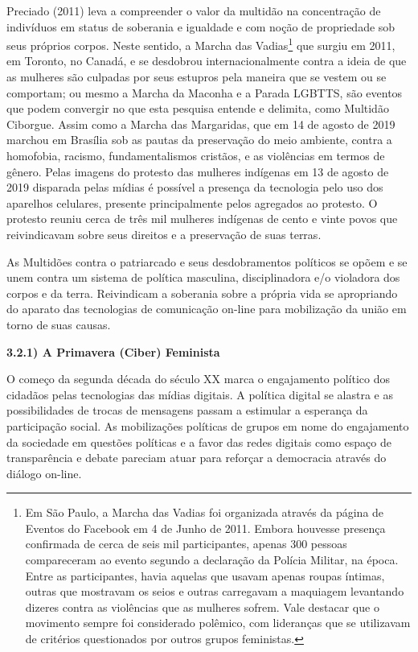 Preciado (2011) leva a compreender o valor da multidão na concentração
de indivíduos em status de soberania e igualdade e com noção de
propriedade sob seus próprios corpos. Neste sentido, a Marcha das
Vadias\footnote{Em São Paulo, a Marcha das Vadias foi organizada através
  da página de Eventos do Facebook em 4 de Junho de 2011. Embora
  houvesse presença confirmada de cerca de seis mil participantes,
  apenas 300 pessoas compareceram ao evento segundo a declaração da
  Polícia Militar, na época. Entre as participantes, havia aquelas que
  usavam apenas roupas íntimas, outras que mostravam os seios e outras
  carregavam a maquiagem levantando dizeres contra as violências que as
  mulheres sofrem. Vale destacar que o movimento sempre foi considerado
  polêmico, com lideranças que se utilizavam de critérios questionados
  por outros grupos feministas.} que surgiu em 2011, em Toronto, no
Canadá, e se desdobrou internacionalmente contra a ideia de que as
mulheres são culpadas por seus estupros pela maneira que se vestem ou se
comportam; ou mesmo a Marcha da Maconha e a Parada LGBTTS, são eventos
que podem convergir no que esta pesquisa entende e delimita, como
Multidão Ciborgue. Assim como a Marcha das Margaridas, que em 14 de
agosto de 2019 marchou em Brasília sob as pautas da preservação do meio
ambiente, contra a homofobia, racismo, fundamentalismos cristãos, e as
violências em termos de gênero. Pelas imagens do protesto das mulheres
indígenas em 13 de agosto de 2019 disparada pelas mídias é possível a
presença da tecnologia pelo uso dos aparelhos celulares, presente
principalmente pelos agregados ao protesto. O protesto reuniu cerca de
três mil mulheres indígenas de cento e vinte povos que reivindicavam
sobre seus direitos e a preservação de suas terras.

As Multidões contra o patriarcado e seus desdobramentos políticos se
opõem e se unem contra um sistema de política masculina, disciplinadora
e/o violadora dos corpos e da terra. Reivindicam a soberania sobre a
própria vida se apropriando do aparato das tecnologias de comunicação
on-line para mobilização da união em torno de suas causas.

\textbf{3.2.1) A Primavera (Ciber) Feminista}

O começo da segunda década do século XX marca o engajamento político dos
cidadãos pelas tecnologias das mídias digitais. A política digital se
alastra e as possibilidades de trocas de mensagens passam a estimular a
esperança da participação social. As mobilizações políticas de grupos em
nome do engajamento da sociedade em questões políticas e a favor das
redes digitais como espaço de transparência e debate pareciam atuar para
reforçar a democracia através do diálogo on-line.

